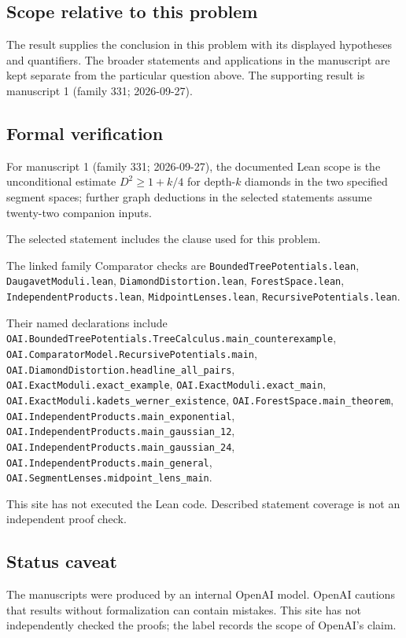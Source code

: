 \documentclass[11pt]{article}
\begin{document}
\subsection{Scope relative to this problem}
The result supplies the conclusion in this problem with its displayed hypotheses and quantifiers. The broader statements and applications in the manuscript are kept separate from the particular question above. The supporting result is manuscript 1 (family 331; 2026-09-27).

\subsection{Formal verification}
For manuscript 1 (family 331; 2026-09-27), the documented Lean scope is the unconditional estimate $D^2\ge1+k/4$ for depth-$k$ diamonds in the two specified segment spaces; further graph deductions in the selected statements assume twenty-two companion inputs.

The selected statement includes the clause used for this problem.

The linked family Comparator checks are \texttt{BoundedTreePotentials.lean}, \texttt{DaugavetModuli.lean}, \texttt{DiamondDistortion.lean}, \texttt{ForestSpace.lean}, \texttt{IndependentProducts.lean}, \texttt{MidpointLenses.lean}, \texttt{RecursivePotentials.lean}.

Their named declarations include \texttt{OAI.BoundedTreePotentials.TreeCalculus.main\_counterexample}, \texttt{OAI.ComparatorModel.RecursivePotentials.main}, \texttt{OAI.DiamondDistortion.headline\_all\_pairs}, \texttt{OAI.ExactModuli.exact\_example}, \texttt{OAI.ExactModuli.exact\_main}, \texttt{OAI.ExactModuli.kadets\_werner\_existence}, \texttt{OAI.ForestSpace.main\_theorem}, \texttt{OAI.IndependentProducts.main\_exponential}, \texttt{OAI.IndependentProducts.main\_gaussian\_12}, \texttt{OAI.IndependentProducts.main\_gaussian\_24}, \texttt{OAI.IndependentProducts.main\_general}, \texttt{OAI.SegmentLenses.midpoint\_lens\_main}.

This site has not executed the Lean code. Described statement coverage is not an independent proof check.

\subsection{Status caveat}
The manuscripts were produced by an internal OpenAI model. OpenAI cautions that results without formalization can contain mistakes. This site has not independently checked the proofs; the label records the scope of OpenAI's claim.
\end{document}
